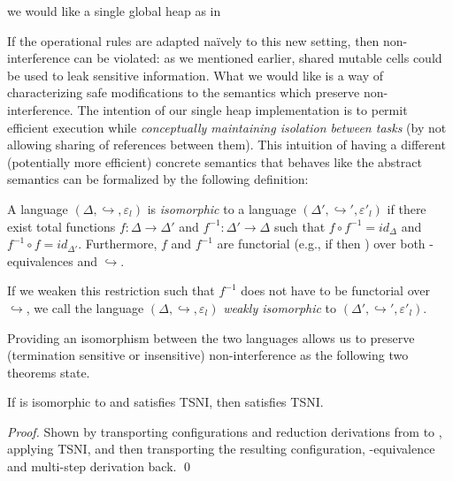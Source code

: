 \documentclass{llncs}
\newcommand{\Varid}[1]{\mathit{#1}}
\begin{document}
we would like a single global heap as in


If the operational rules are adapted na\"ively to this new setting,
then non-interference can be violated: as we mentioned earlier,
shared mutable cells could be used to leak sensitive information.
What we would like is a way of characterizing safe modifications to
the semantics which preserve non-interference.
The intention of our single heap implementation is to permit
efficient execution while \emph{conceptually maintaining isolation between
tasks} (by not allowing sharing of references between them).
This intuition of having a different (potentially more efficient)
concrete semantics that behaves like the abstract semantics
can be formalized by the following definition:



\begin{definition}
  A language \ensuremath{(\Delta,\hookrightarrow,\varepsilon_{l})} is \textit{isomorphic} to a
  language \ensuremath{(\Delta',\hookrightarrow',\varepsilon'_{l})} if there exist total functions \ensuremath{\Varid{f}\mathbin{:}\Delta\rightarrow\Delta'} and \ensuremath{\Varid{f}^{-1}\mathbin{:}\Delta'\rightarrow\Delta} such that \ensuremath{\Varid{f}\circ\Varid{f}^{-1}\mathrel{=}id_{\Delta}} and \ensuremath{\Varid{f}^{-1}\circ\Varid{f}\mathrel{=}id_{\Delta'}}.  Furthermore, \ensuremath{\Varid{f}} and \ensuremath{\Varid{f}^{-1}} are functorial (e.g., if
   then ) over both
  -equivalences and \ensuremath{\hookrightarrow}.

  If we weaken this restriction such that \ensuremath{\Varid{f}^{-1}} does
  not have to be functorial over \ensuremath{\hookrightarrow}, we call the
  language \ensuremath{(\Delta,\hookrightarrow,\varepsilon_{l})} \textit{weakly isomorphic} to
  \ensuremath{(\Delta',\hookrightarrow',\varepsilon'_{l})}.
\end{definition}

Providing an isomorphism between the two languages allows us to
preserve (termination sensitive or insensitive) non-interference
as the following two theorems state.

\begin{theorem}
  \label{thm:iso-tsni}
  If  is isomorphic to  and  satisfies TSNI, then
   satisfies TSNI.
\end{theorem}

\begin{proof}
  Shown by transporting configurations and reduction derivations from
   to , applying TSNI, and then transporting the
  resulting configuration, -equivalence and multi-step derivation back.
  \qed
\end{proof}
\end{document}
